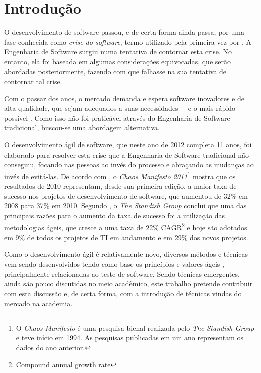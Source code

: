 \chapter{Introdução}

O desenvolvimento de software passou, e de certa forma ainda passa, por uma fase conhecida como \emph{crise do software}, termo utilizado pela primeira vez por . A Engenharia de Software surgiu \cite{NaurRandell} numa tentativa de contornar esta crise. No entanto, ela foi baseada em algumas considerações equivocadas, que serão abordadas posteriormente, fazendo com que falhasse na sua tentativa de contornar tal crise.

Com o passar dos anos, o mercado demanda e espera software inovadores e de alta qualidade, que sejam adequados a suas necessidades $-$ e o mais rápido possível \cite{TheBusinessOfInnovation}. Como isso não foi praticável através do Engenharia de Software tradicional, buscou-se uma abordagem alternativa.

O desenvolvimento ágil de software, que neste ano de 2012 completa 11 anos, foi elaborado \cite{AgileManifesto} para resolver esta crise que a Engenharia de Software tradicional não conseguiu, focando nas pessoas ao invés do processo e abraçando as mudanças ao invés de evitá-las. De acordo com , o \textit{Chaos Manifesto 2011}\footnote{O \textit{Chaos Manifesto} é uma pesquisa bienal realizada pelo \textit{The Standish Group} e teve início em 1994. As pesquisas publicadas em um ano representam os dados do ano anterior.} mostra que os resultados de 2010 representam, desde sua primeira edição, a maior taxa de sucesso nos projetos de desenvolvimento de software, que aumentou de 32\% em 2008 para 37\% em 2010. Segundo , o \textit{The Standish Group} conclui que uma das principais razões para o aumento da taxa de sucesso foi a utilização das metodologias ágeis, que cresce a uma taxa de 22\% CAGR\footnote{\href{http://en.wikipedia.org/wiki/Compound_annual_growth_rate} {Compound annual growth rate}} e hoje são adotados em 9\% de todos os projetos de TI em andamento e em 29\% dos novos projetos.

Como o desenvolvimento ágil é relativamente novo, diversos métodos e técnicas vem sendo desenvolvidos tendo como base os princípios e valores ágeis \cite{BDDRodrigo}, principalmente relacionadas ao teste de software. Sendo técnicas emergentes, ainda são pouco discutidas no meio acadêmico, este trabalho pretende contribuir com esta discussão e, de certa forma, com a introdução de técnicas vindas do mercado na academia.


